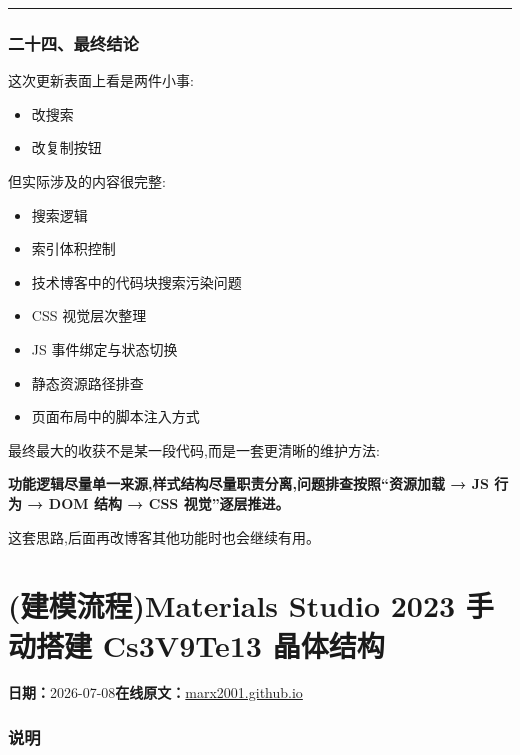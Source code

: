 \documentclass[lang=cn,scheme=chinese,color=blue,device=normal,toc=onecol,math=cm]{elegantbook}
\begin{document}
\medskip\hrule\medskip


\subsubsection{二十四、最终结论}


这次更新表面上看是两件小事:\par


\begin{itemize}
\item 改搜索
\item 改复制按钮
\end{itemize}


但实际涉及的内容很完整:\par


\begin{itemize}
\item 搜索逻辑
\item 索引体积控制
\item 技术博客中的代码块搜索污染问题
\item CSS 视觉层次整理
\item JS 事件绑定与状态切换
\item 静态资源路径排查
\item 页面布局中的脚本注入方式
\end{itemize}


最终最大的收获不是某一段代码,而是一套更清晰的维护方法:\par


\begin{quotebox}
\textbf{功能逻辑尽量单一来源,样式结构尽量职责分离,问题排查按照“资源加载 → JS 行为 → DOM 结构 → CSS 视觉”逐层推进。}\par
\end{quotebox}


这套思路,后面再改博客其他功能时也会继续有用。\par



\section{(建模流程)Materials Studio 2023 手动搭建 Cs3V9Te13 晶体结构}
\begin{articlemeta}
\textbf{日期：}2026-07-08\hfill\textbf{在线原文：}\href{https://marx2001.github.io/sci-note\_posts/20260708-build}{marx2001.github.io}
\end{articlemeta}

\subsubsection{说明}
\end{document}
